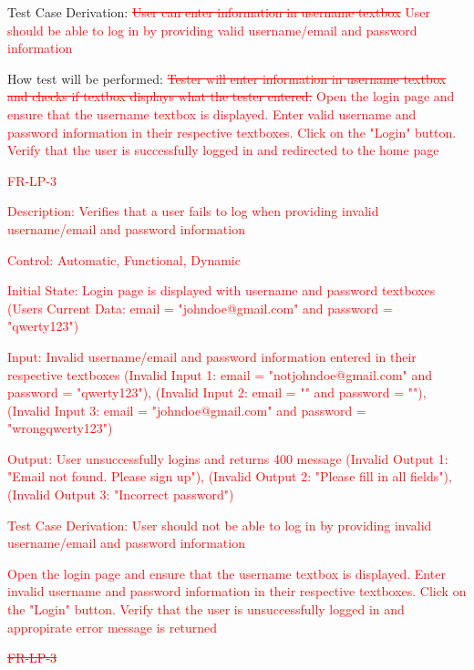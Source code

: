\documentclass[12pt, titlepage]{article}
\begin{document}
\begin{enumerate}
	Test Case Derivation: \textcolor{red}{\sout{User can enter information in username textbox}} \textcolor{red}{User should be able to log in by providing valid username/email and password information}
	
	How test will be performed: \textcolor{red}{\sout{Tester will enter information in username textbox and checks if textbox displays what the tester entered.}} \textcolor{red}{ Open the login page and ensure that the username textbox is displayed. Enter valid username and password information in their respective textboxes. Click on the "Login" button. Verify that the user is successfully logged in and redirected to the home page}

        \textcolor{red}{\item{FR-LP-3\\}}

        \textcolor{red}{Description: Verifies that a user fails to log when providing invalid username/email and password information}
	
	\textcolor{red}{Control: Automatic, Functional, Dynamic}
	
	\textcolor{red}{Initial State: Login page is displayed with username and password textboxes (Users Current Data: email = "johndoe@gmail.com" and password = "qwerty{}123")}
	
	\textcolor{red}{Input: Invalid username/email and password information entered in their respective textboxes (Invalid Input 1: email = "notjohndoe@gmail.com" and password = "qwerty{}123"), (Invalid Input 2: email = "" and password = ""), (Invalid Input 3: email = "johndoe@gmail.com" and password = "wrongqwerty{}123")}
	
	\textcolor{red}{Output: User unsuccessfully logins and returns 400 message (Invalid Output 1: "Email not found. Please sign up"), (Invalid Output 2: "Please fill in all fields"), (Invalid Output 3: "Incorrect password")}
	
	\textcolor{red}{Test Case Derivation: User should not be able to log in by providing invalid username/email and password information}
	
	\textcolor{red}{Open the login page and ensure that the username textbox is displayed. Enter invalid username and password information in their respective textboxes. Click on the "Login" button. Verify that the user is unsuccessfully logged in and appropirate error message is returned}

\item{\textcolor{red}{\sout{FR-LP-3}}\\}
	

\end{enumerate}
\end{document}
